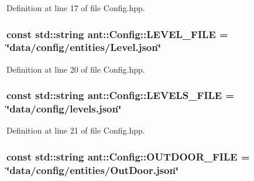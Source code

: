Definition at line 17 of file Config.\+hpp.

\hypertarget{classant_1_1_config_a03d4a1c2b70dbe3d3877945b7c989858}{
\subsubsection[{L\+E\+V\+E\+L\+\_\+\+F\+I\+L\+E}]{\setlength{\rightskip}{0pt plus 5cm}const std\+::string ant\+::\+Config\+::\+L\+E\+V\+E\+L\+\_\+\+F\+I\+L\+E = \char`\"{}data/config/entities/Level.\+json\char`\"{}\hspace{0.3cm}{\ttfamily [static]}}}\label{classant_1_1_config_a03d4a1c2b70dbe3d3877945b7c989858}


Definition at line 20 of file Config.\+hpp.

\hypertarget{classant_1_1_config_ad1f4e394b08d585a4047e3a4db7aeb90}{
\subsubsection[{L\+E\+V\+E\+L\+S\+\_\+\+F\+I\+L\+E}]{\setlength{\rightskip}{0pt plus 5cm}const std\+::string ant\+::\+Config\+::\+L\+E\+V\+E\+L\+S\+\_\+\+F\+I\+L\+E = \char`\"{}data/config/levels.\+json\char`\"{}\hspace{0.3cm}{\ttfamily [static]}}}\label{classant_1_1_config_ad1f4e394b08d585a4047e3a4db7aeb90}


Definition at line 21 of file Config.\+hpp.

\hypertarget{classant_1_1_config_aba26e65b1ef017af8e7e48eba3180acc}{
\subsubsection[{O\+U\+T\+D\+O\+O\+R\+\_\+\+F\+I\+L\+E}]{\setlength{\rightskip}{0pt plus 5cm}const std\+::string ant\+::\+Config\+::\+O\+U\+T\+D\+O\+O\+R\+\_\+\+F\+I\+L\+E = \char`\"{}data/config/entities/Out\+Door.\+json\char`\"{}\hspace{0.3cm}{\ttfamily [static]}}}\label{classant_1_1_config_aba26e65b1ef017af8e7e48eba3180acc}


